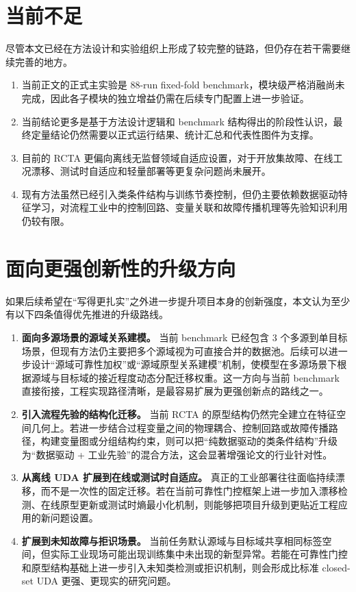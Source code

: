 \section{当前不足}
尽管本文已经在方法设计和实验组织上形成了较完整的链路，但仍存在若干需要继续完善的地方。

\begin{enumerate}
\item 当前正文的正式主实验是 88-run fixed-fold benchmark，模块级严格消融尚未完成，因此各子模块的独立增益仍需在后续专门配置上进一步验证。
\item 当前结论更多是基于方法设计逻辑和 benchmark 结构得出的阶段性认识，最终定量结论仍然需要以正式运行结果、统计汇总和代表性图件为支撑。
\item 目前的 RCTA 更偏向离线无监督领域自适应设置，对于开放集故障、在线工况漂移、测试时自适应和轻量部署等更复杂问题尚未展开。
\item 现有方法虽然已经引入类条件结构与训练节奏控制，但仍主要依赖数据驱动特征学习，对流程工业中的控制回路、变量关联和故障传播机理等先验知识利用仍较有限。
\end{enumerate}

\section{面向更强创新性的升级方向}
如果后续希望在“写得更扎实”之外进一步提升项目本身的创新强度，本文认为至少有以下四条值得优先推进的升级路线。

\begin{enumerate}
\item \textbf{面向多源场景的源域关系建模。} 当前 benchmark 已经包含 3 个多源到单目标场景，但现有方法仍主要把多个源域视为可直接合并的数据池。后续可以进一步设计“源域可靠性加权”或“源域原型关系建模”机制，使模型在多源场景下根据源域与目标域的接近程度动态分配迁移权重。这一方向与当前 benchmark 直接衔接，工程实现路径清晰，是最容易扩展为更强创新点的路线之一。
\item \textbf{引入流程先验的结构化迁移。} 当前 RCTA 的原型结构仍然完全建立在特征空间几何上。若进一步结合过程变量之间的物理耦合、控制回路或故障传播路径，构建变量图或分组结构约束，则可以把“纯数据驱动的类条件结构”升级为“数据驱动 + 工业先验”的混合方法，这会显著增强论文的行业针对性。
\item \textbf{从离线 UDA 扩展到在线或测试时自适应。} 真正的工业部署往往面临持续漂移，而不是一次性的固定迁移。若在当前可靠性门控框架上进一步加入漂移检测、在线原型更新或测试时熵最小化机制，则能够把项目升级到更贴近工程应用的新问题设置。
\item \textbf{扩展到未知故障与拒识场景。} 当前任务默认源域与目标域共享相同标签空间，但实际工业现场可能出现训练集中未出现的新型异常。若能在可靠性门控和原型结构基础上进一步引入未知类检测或拒识机制，则会形成比标准 closed-set UDA 更强、更现实的研究问题。
\end{enumerate}

